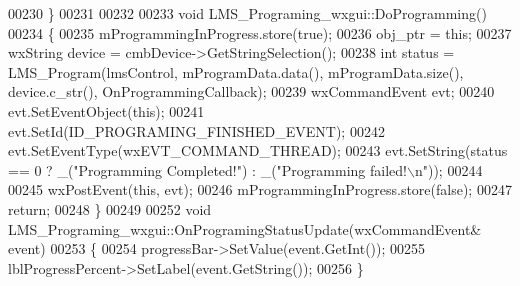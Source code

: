 \begin{DoxyCode}
00230 \}
00231 
00232 
00233 \textcolor{keywordtype}{void} LMS_Programing_wxgui::DoProgramming()
00234 \{
00235     mProgrammingInProgress.store(\textcolor{keyword}{true});
00236     obj_ptr = \textcolor{keyword}{this};
00237     wxString device = cmbDevice->GetStringSelection();
00238     \textcolor{keywordtype}{int} status = LMS_Program(lmsControl, mProgramData.data(), mProgramData.size(), device.c\_str(), 
      OnProgrammingCallback);
00239     wxCommandEvent evt;
00240     evt.SetEventObject(\textcolor{keyword}{this});
00241     evt.SetId(ID_PROGRAMING_FINISHED_EVENT);
00242     evt.SetEventType(wxEVT\_COMMAND\_THREAD);
00243     evt.SetString(status == 0 ? \_(\textcolor{stringliteral}{"Programming Completed!"}) : \_(\textcolor{stringliteral}{"Programming failed!\(\backslash\)n"}));
00244 
00245     wxPostEvent(\textcolor{keyword}{this}, evt);
00246     mProgrammingInProgress.store(\textcolor{keyword}{false});
00247     \textcolor{keywordflow}{return};
00248 \}
00249 
00252 \textcolor{keywordtype}{void} LMS_Programing_wxgui::OnProgramingStatusUpdate(wxCommandEvent& event)
00253 \{
00254     progressBar->SetValue(event.GetInt());
00255     lblProgressPercent->SetLabel(event.GetString());
00256 \}
\end{DoxyCode}
